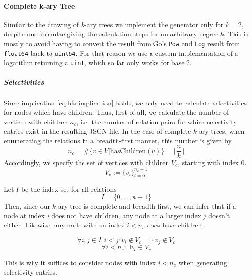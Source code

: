 \paragraph{Complete k-ary Tree}

\begin{note}
    Similar to the drawing of $k$-ary trees we implement the generator only for $k=2$, despite our formulae giving the calculation steps for an arbitrary degree $k$. This is mostly to avoid having to convert the result from Go's \texttt{Pow} and \texttt{Log} result from \texttt{float64} back to \texttt{uint64}. For that reason we use a custom implementation of a logarithm returning a \texttt{uint}, which so far only works for base 2.
\end{note}

\subparagraph{Selectivities}
Since implication \ref{eq:bfs-implication} holds, we only need to calculate selectivities for nodes which have children.
Thus, first of all, we calculate the number of vertices with children $n_c$, i.e. the number of relation-pairs for which selectivity entries exist in the resulting JSON file.
In the case of complete $k$-ary trees, when enumerating the relations in a breadth-first manner, this number is given by 
\begin{equation}
    n_{c} = \#\{v \in V \vert \text{hasChildren}(v)\} = \lceil\frac{n}{k}\rceil
\end{equation}
Accordingly, we specify the set of vertices with children $V_c$, starting with index 0.
\begin{equation}
   V_c := \{v_i\}_{i=0}^{n_{c}-1}
\end{equation} 

\begin{note}
Let $I$ be the index set for all relations
\begin{equation}
    I = \{0,\ldots,n-1\}
\end{equation}
Then, since our $k$-ary tree is complete and breadth-first, we can infer that if a node at index $i$ does not have children, any node at a larger index $j$ doesn't either. Likewise, any node with an index $i < n_c$ does have children. 

\begin{equation}
    \forall i,j \in I, i < j \colon v_i \notin V_c \implies v_j \notin V_c
\end{equation}
\begin{equation}
    \forall i < n_c \colon \exists v_i \in V_c
\end{equation}

This is why it suffices to consider nodes with index $i < n_c$ when generating selectivity entries.
\end{note}

